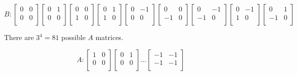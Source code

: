 \documentclass[
12.5pt, 					%
a4paper, 				%
oneside,					%
headinclude,footinclude, %
BCOR5mm, 				%
abstract=on
]{scrreprt}
\numberwithin{equation}{chapter}
\begin{document}
$$
B :
 \begin{bmatrix}
  0 & 0 \\
  0 & 0 \\
 \end{bmatrix}
 \begin{bmatrix}
  0 & 1 \\
  0 & 0 \\
 \end{bmatrix}
  \begin{bmatrix}
  0 & 0 \\
  1& 0 \\
 \end{bmatrix}
   \begin{bmatrix}
  0 & 1 \\
  1& 0 \\
 \end{bmatrix}
  \begin{bmatrix}
  0 & -1 \\
  0 & 0 \\
 \end{bmatrix}
  \begin{bmatrix}
  0 & 0 \\
  -1 & 0 \\
 \end{bmatrix}
 \begin{bmatrix}
  0 & -1 \\
  -1 & 0 \\
 \end{bmatrix}
  \begin{bmatrix}
  0 & -1 \\
  1 & 0 \\
 \end{bmatrix}
   \begin{bmatrix}
  0 & 1 \\
  -1 & 0 \\
 \end{bmatrix}
$$

There are $3^4=81$ possible $A$ matrices.

$$
A :
 \begin{bmatrix}
  1 & 0 \\
  0 & 0 \\
 \end{bmatrix}
 \begin{bmatrix}
  0 & 1 \\
  0 & 0 \\
 \end{bmatrix}
 ...
 \begin{bmatrix}
  -1 & -1 \\
  -1 & -1 \\
 \end{bmatrix}
$$
\end{document}
